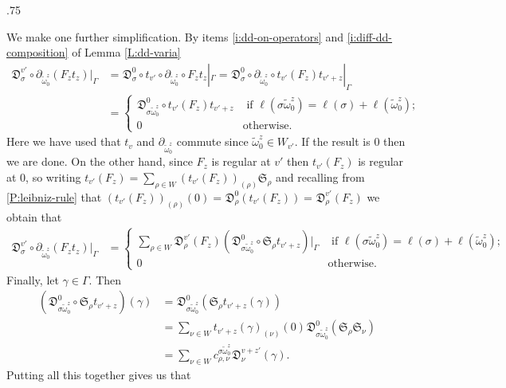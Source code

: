 \documentclass[11pt,fleqn]{amsart}
\makeatletter
\renewcommand\proofname{Proof}
\renewenvironment{proof}[1][\textit{\proofname}]{\par
 \pushQED{\qed}%
 \normalfont \topsep.75\paraskip\relax
 \trivlist
 \item[\hskip\labelsep
 \itshape
 #1\@addpunct{.}]\ignorespaces
}{%
 \popQED\endtrivlist\@endpefalse
}
\newcounter{para}[section]
\newcommand\D[3]{{}^{#1} \mathfrak D_{#2}^{#3}}
\renewcommand\SS{\mathfrak S}
\makeatother
\begin{document}
\begin{proof}
We make one further simplification. By items \ref{i:dd-on-operators} and
\ref{i:diff-dd-composition} of Lemma \ref{L:dd-varia} 
\begin{align*}
\D{}{\sigma}{v'} \circ 
	\partial_{\widetilde \omega_0^z}(F_z t_z) |_\Gamma
	&= \D{}{\sigma}{0} \circ t_{v'} \circ \partial_{\widetilde \omega_0^z} 
		\circ F_z t_z |_\Gamma
	= \D{}{\sigma}{0} \circ \partial_{\widetilde \omega_0^z} \circ t_{v'}(F_z) 
		t_{v'+z} |_\Gamma \\
	&= \begin{cases}
		\D{}{\sigma \widetilde \omega_0^z}{0} \circ t_{v'}(F_z) t_{v'+z}
			& \mbox{ if } \ell(\sigma \widetilde \omega_0^z) = \ell(\sigma)
				+ \ell(\widetilde \omega_0^z);\\
		0 & \mbox{otherwise.}
	\end{cases}
\end{align*}
Here we have used that $t_v$ and $\partial_{\widetilde \omega_0^z}$ commute since
$\widetilde \omega_0^z \in W_{v'}$. If the result is $0$ then we are done. On the 
other hand, since $F_z$ is regular at $v'$ then $t_{v'}(F_z)$ is regular at 
$0$, so writing $t_{v'}(F_z) = \sum_{\rho \in W} (t_{v'}(F_z))_{(\rho)} 
\SS_\rho$ and recalling from \ref{P:leibniz-rule} that 
$(t_{v'}(F_z))_{(\rho)}(0) = \D{}{\rho}{0}(t_{v'}(F_z)) = \D{}{\rho}{v'}(F_z)$
we obtain that
\begin{align*}
\D{}{\sigma}{v'} \circ \partial_{\widetilde \omega_0^z} (F_z t_z)|_\Gamma
	&= \begin{cases}
		\sum_{\rho \in W} 
			\D{}{\rho}{v'}(F_z)
				(\D{}{\sigma \widetilde \omega_0^z}{0} \circ 
					\SS_\rho t_{v'+z})|_\Gamma
			& \mbox{ if } \ell(\sigma \widetilde \omega_0^z) = \ell(\sigma)
				+ \ell(\widetilde \omega_0^z);\\
		0 & \mbox{otherwise.}
	\end{cases}
\end{align*}
Finally, let $\gamma \in \Gamma$. Then 
\begin{align*}
(\D{}{\sigma \widetilde \omega_0^z}{0} \circ \SS_\rho t_{v'+z}) (\gamma)
	&= \D{}{\sigma \widetilde \omega_0^z}{0}(\SS_\rho t_{v'+z}(\gamma)) \\
	&= \sum_{\nu \in W} t_{v'+z}(\gamma)_{(\nu)}(0)
		\D{}{\sigma \widetilde \omega_0^z}{0} (\SS_{\rho} \SS_{\nu}) \\
	&= \sum_{\nu \in W}
		c^{\sigma \widetilde \omega_0^z}_{\rho, \nu} \D{}{\nu}{v+z'}(\gamma).
\end{align*} 
Putting all this together gives us that
\begin{align*}

\end{align*}
\end{proof}
\end{document}

